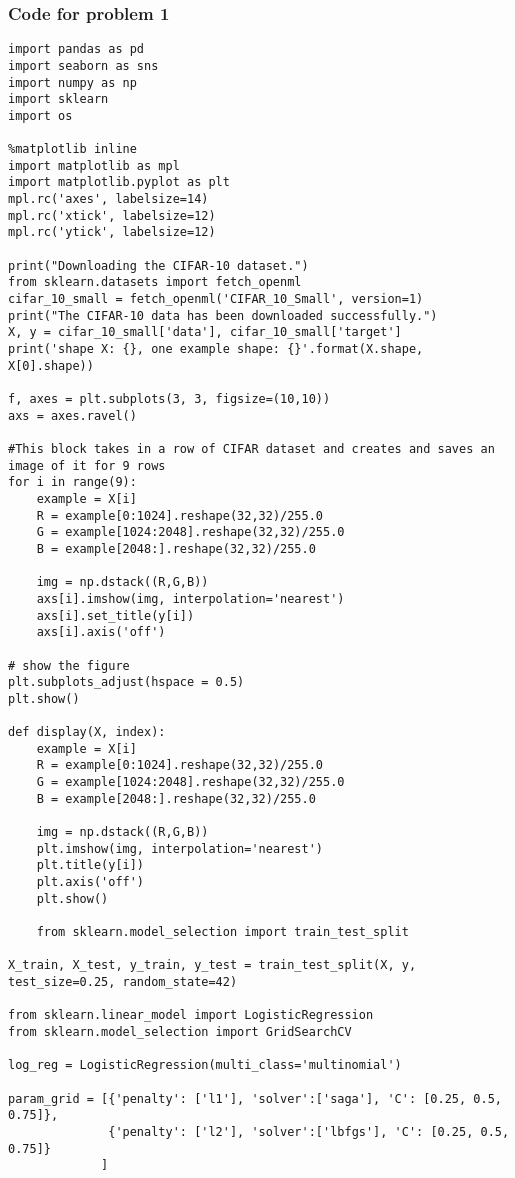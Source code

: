 \documentclass[12pt]{article}%
\begin{document}
\subsubsection*{Code for problem 1}
\begin{lstlisting}
import pandas as pd
import seaborn as sns
import numpy as np
import sklearn
import os

%matplotlib inline
import matplotlib as mpl
import matplotlib.pyplot as plt
mpl.rc('axes', labelsize=14)
mpl.rc('xtick', labelsize=12)
mpl.rc('ytick', labelsize=12)

print("Downloading the CIFAR-10 dataset.")
from sklearn.datasets import fetch_openml
cifar_10_small = fetch_openml('CIFAR_10_Small', version=1)
print("The CIFAR-10 data has been downloaded successfully.")
X, y = cifar_10_small['data'], cifar_10_small['target']
print('shape X: {}, one example shape: {}'.format(X.shape, X[0].shape))

f, axes = plt.subplots(3, 3, figsize=(10,10))
axs = axes.ravel()

#This block takes in a row of CIFAR dataset and creates and saves an image of it for 9 rows
for i in range(9):
    example = X[i]
    R = example[0:1024].reshape(32,32)/255.0
    G = example[1024:2048].reshape(32,32)/255.0
    B = example[2048:].reshape(32,32)/255.0

    img = np.dstack((R,G,B))
    axs[i].imshow(img, interpolation='nearest')
    axs[i].set_title(y[i])
    axs[i].axis('off')

# show the figure
plt.subplots_adjust(hspace = 0.5)
plt.show()

def display(X, index):
    example = X[i]
    R = example[0:1024].reshape(32,32)/255.0
    G = example[1024:2048].reshape(32,32)/255.0
    B = example[2048:].reshape(32,32)/255.0

    img = np.dstack((R,G,B))
    plt.imshow(img, interpolation='nearest')
    plt.title(y[i])
    plt.axis('off')
    plt.show()
    
    from sklearn.model_selection import train_test_split

X_train, X_test, y_train, y_test = train_test_split(X, y, test_size=0.25, random_state=42)

from sklearn.linear_model import LogisticRegression
from sklearn.model_selection import GridSearchCV

log_reg = LogisticRegression(multi_class='multinomial')

param_grid = [{'penalty': ['l1'], 'solver':['saga'], 'C': [0.25, 0.5, 0.75]},
              {'penalty': ['l2'], 'solver':['lbfgs'], 'C': [0.25, 0.5, 0.75]}
             ]


\end{lstlisting}
\end{document}
